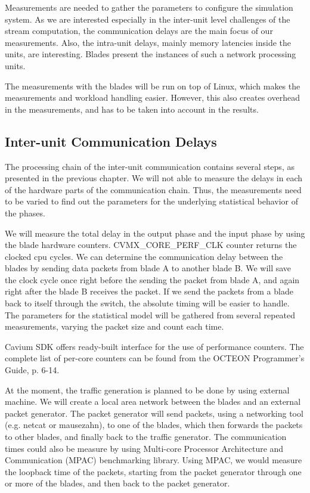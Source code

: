 Measurements are needed to gather the parameters to configure the simulation system. As we are interested especially in the inter-unit level challenges of the stream computation, the communication delays are the main focus of our measurements. Also, the intra-unit delays, mainly memory latencies inside the units, are interesting. Blades present the instances of such a network processing units.

The measurements with the blades will be run on top of Linux, which makes the measurements and workload handling easier. However, this also creates overhead in the measurements, and has to be taken into account in the results.

\subsection{Inter-unit Communication Delays}
The processing chain of the inter-unit communication contains several steps, as presented in the previous chapter. We will not able to measure the delays in each of the hardware parts of the communication chain. Thus, the measurements need to be varied to find out the parameters for the underlying statistical behavior of the phases.

We will measure the total delay in the output phase and the input phase by using the blade hardware counters. CVMX\_CORE\_PERF\_CLK counter returns the clocked cpu cycles. We can determine the communication delay between the blades by sending data packets from blade A to another blade B. We will save the clock cycle once right before the sending the packet from blade A, and again right after the blade B receives the packet. If we send the packets from a blade back to itself through the switch, the absolute timing will be easier to handle. The parameters for the statistical model will be gathered from several repeated measurements, varying the packet size and count each time.

Cavium SDK offers ready-built interface for the use of performance counters. The complete list of per-core counters can be found from the OCTEON Programmer's Guide, p. 6-14.

At the moment, the traffic generation is planned to be done by using external machine. We will create a local area network between the blades and an external packet generator. The packet generator will send packets, using a networking tool (e.g. netcat or mausezahn), to one of the blades, which then forwards the packets to other blades, and finally back to the traffic generator. The communication times could also be measure by using Multi-core Processor Architecture and Communication (MPAC) benchmarking library. Using MPAC, we would measure the loopback time of the packets, starting from the packet generator through one or more of the blades, and then back to the packet generator.

